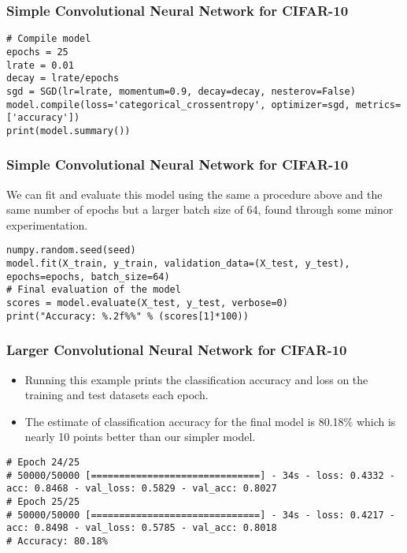 \begin{frame}[fragile] \frametitle{Simple Convolutional Neural Network for CIFAR-10}
\begin{lstlisting}
# Compile model
epochs = 25
lrate = 0.01
decay = lrate/epochs
sgd = SGD(lr=lrate, momentum=0.9, decay=decay, nesterov=False)
model.compile(loss='categorical_crossentropy', optimizer=sgd, metrics=['accuracy'])
print(model.summary())
\end{lstlisting}

\end{frame}

\begin{frame}[fragile] \frametitle{Simple Convolutional Neural Network for CIFAR-10}
We can fit and evaluate this model using the same a procedure above and the same number of epochs but a larger batch size of 64, found through some minor experimentation.
\begin{lstlisting}
numpy.random.seed(seed)
model.fit(X_train, y_train, validation_data=(X_test, y_test), epochs=epochs, batch_size=64)
# Final evaluation of the model
scores = model.evaluate(X_test, y_test, verbose=0)
print("Accuracy: %.2f%%" % (scores[1]*100))
\end{lstlisting}

\end{frame}

\begin{frame}[fragile] \frametitle{Larger Convolutional Neural Network for CIFAR-10}
\begin{itemize}
\item Running this example prints the classification accuracy and loss on the training and test datasets each epoch. 
\item The estimate of classification accuracy for the final model is 80.18\% which is nearly 10 points better than our simpler model.
\end{itemize}
\begin{lstlisting}
# Epoch 24/25
# 50000/50000 [==============================] - 34s - loss: 0.4332 - acc: 0.8468 - val_loss: 0.5829 - val_acc: 0.8027
# Epoch 25/25
# 50000/50000 [==============================] - 34s - loss: 0.4217 - acc: 0.8498 - val_loss: 0.5785 - val_acc: 0.8018
# Accuracy: 80.18%
\end{lstlisting}
\end{frame}

